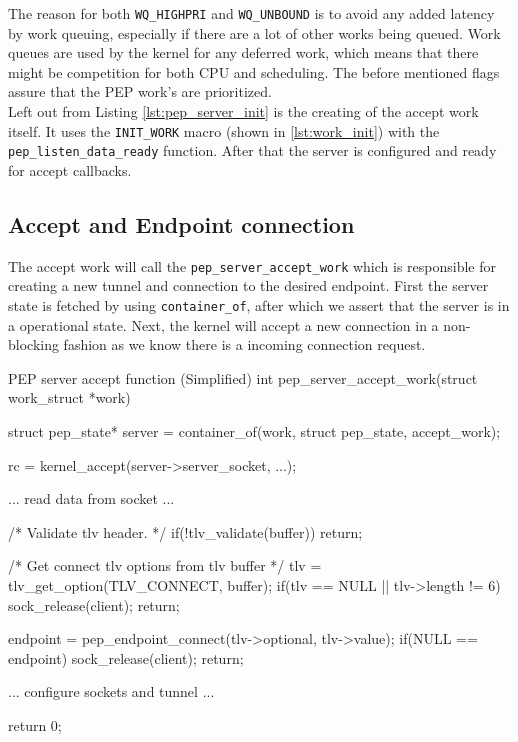\documentclass[a4paper,english, 11pt]{report}
\begin{document}
The reason for both \verb|WQ_HIGHPRI| and \verb|WQ_UNBOUND| is to avoid any added latency by work queuing, especially if there are a lot of other works being queued. Work queues are used by the kernel for any deferred work, which means that there might be competition for both CPU and scheduling. The before mentioned flags assure that the PEP work's are prioritized.\\

Left out from Listing \ref{lst:pep_server_init} is the creating of the accept work itself. It uses the \verb|INIT_WORK| macro (shown in \ref{lst:work_init}) with the \verb|pep_listen_data_ready| function. After that the server is configured and ready for accept callbacks.

\subsection{Accept and Endpoint connection}
The accept work will call the \verb|pep_server_accept_work| which is responsible for creating a new tunnel and connection to the desired endpoint. First the server state is fetched by using \verb|container_of|, after which we assert that the server is in a operational state. Next, the kernel will accept a new connection in a non-blocking fashion as we know there is a incoming connection request.\\

\begin{autonumlstlisting}[label=lst:pep_server_accept]{PEP server accept function (Simplified)}
int pep_server_accept_work(struct work_struct *work)
{
    struct pep_state* server = container_of(work, struct pep_state, accept_work);

    rc = kernel_accept(server->server_socket, ...);
    
    ... read data from socket ...

    /* Validate tlv header. */
    if(!tlv_validate(buffer)){
        return;
    }
    
    /* Get connect tlv options from tlv buffer */
    tlv = tlv_get_option(TLV_CONNECT, buffer);
    if(tlv == NULL || tlv->length != 6){
        sock_release(client);
        return; 
    }

    endpoint = pep_endpoint_connect(tlv->optional, tlv->value);
    if(NULL == endpoint){
        sock_release(client);
        return; 
    }
    
    ... configure sockets and tunnel ...
    
    return 0;
}
\end{autonumlstlisting}
\end{document}
